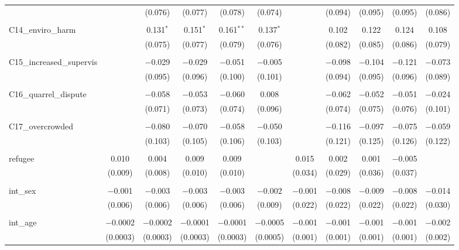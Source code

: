 \begin{table}[H]
\begin{tabular}{@{\extracolsep{4pt}}lcccccccccc}
  &  & (0.076) & (0.077) & (0.078) & (0.074) &  & (0.094) & (0.095) & (0.095) & (0.086) \\ 
  & & & & & & & & & & \\ 
 C14\_enviro\_harm &  & 0.131$^{*}$ & 0.151$^{*}$ & 0.161$^{**}$ & 0.137$^{*}$ &  & 0.102 & 0.122 & 0.124 & 0.108 \\ 
  &  & (0.075) & (0.077) & (0.079) & (0.076) &  & (0.082) & (0.085) & (0.086) & (0.079) \\ 
  & & & & & & & & & & \\ 
 C15\_increased\_supervis &  & $-$0.029 & $-$0.029 & $-$0.051 & $-$0.005 &  & $-$0.098 & $-$0.104 & $-$0.121 & $-$0.073 \\ 
  &  & (0.095) & (0.096) & (0.100) & (0.101) &  & (0.094) & (0.095) & (0.096) & (0.089) \\ 
  & & & & & & & & & & \\ 
 C16\_quarrel\_dispute &  & $-$0.058 & $-$0.053 & $-$0.060 & 0.008 &  & $-$0.062 & $-$0.052 & $-$0.051 & $-$0.024 \\ 
  &  & (0.071) & (0.073) & (0.074) & (0.096) &  & (0.074) & (0.075) & (0.076) & (0.101) \\ 
  & & & & & & & & & & \\ 
 C17\_overcrowded &  & $-$0.080 & $-$0.070 & $-$0.058 & $-$0.050 &  & $-$0.116 & $-$0.097 & $-$0.075 & $-$0.059 \\ 
  &  & (0.103) & (0.105) & (0.106) & (0.103) &  & (0.121) & (0.125) & (0.126) & (0.122) \\ 
  & & & & & & & & & & \\ 
 refugee & 0.010 & 0.004 & 0.009 & 0.009 &  & 0.015 & 0.002 & 0.001 & $-$0.005 &  \\ 
  & (0.009) & (0.008) & (0.010) & (0.010) &  & (0.034) & (0.029) & (0.036) & (0.037) &  \\ 
  & & & & & & & & & & \\ 
 int\_sex & $-$0.001 & $-$0.003 & $-$0.003 & $-$0.003 & $-$0.002 & $-$0.001 & $-$0.008 & $-$0.009 & $-$0.008 & $-$0.014 \\ 
  & (0.006) & (0.006) & (0.006) & (0.006) & (0.009) & (0.022) & (0.022) & (0.022) & (0.022) & (0.030) \\ 
  & & & & & & & & & & \\ 
 int\_age & $-$0.0002 & $-$0.0002 & $-$0.0001 & $-$0.0001 & $-$0.0005 & $-$0.001 & $-$0.001 & $-$0.001 & $-$0.001 & $-$0.002 \\ 
  & (0.0003) & (0.0003) & (0.0003) & (0.0003) & (0.0005) & (0.001) & (0.001) & (0.001) & (0.001) & (0.002) \\ 

\end{tabular}
\end{table}
